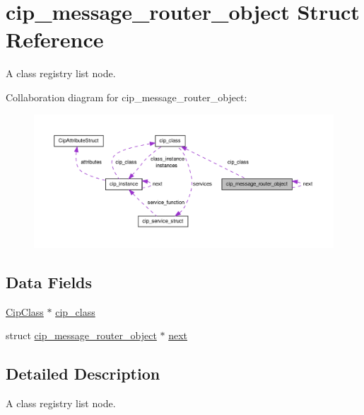 \hypertarget{structcip__message__router__object}{\section{cip\-\_\-message\-\_\-router\-\_\-object \-Struct \-Reference}
\label{d2/d6d/structcip__message__router__object}
}


\-A class registry list node.  




\-Collaboration diagram for cip\-\_\-message\-\_\-router\-\_\-object\-:
\nopagebreak
\begin{figure}[H]
\begin{center}
\leavevmode
\includegraphics[width=350pt]{d8/d05/structcip__message__router__object__coll__graph}
\end{center}
\end{figure}
\subsection*{\-Data \-Fields}
\begin{DoxyCompactItemize}
\item 
\hyperlink{ciptypes_8h_a175191808b8fac50b47d9bbc9edc6051}{\-Cip\-Class} $\ast$ \hyperlink{structcip__message__router__object_a440815cdd66b94380266bbc5e1a9a459}{cip\-\_\-class}
\item 
struct \hyperlink{structcip__message__router__object}{cip\-\_\-message\-\_\-router\-\_\-object} $\ast$ \hyperlink{structcip__message__router__object_ae5fe968ec24697e92f45cceb93cc437f}{next}
\end{DoxyCompactItemize}


\subsection{\-Detailed \-Description}
\-A class registry list node. 

